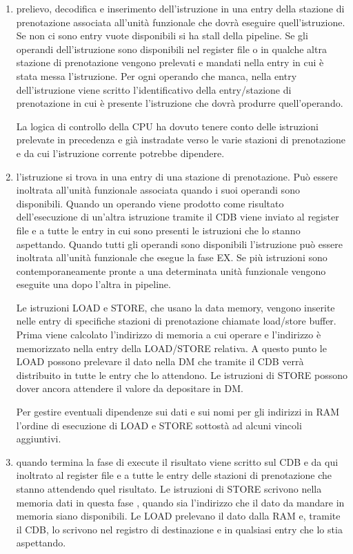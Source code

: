 \begin{enumerate}
  \item {} prelievo, decodifica e inserimento dell'istruzione in una entry della stazione di prenotazione associata all'unità funzionale che dovrà eseguire quell'istruzione. Se non ci sono entry vuote disponibili si ha stall della pipeline. Se gli operandi dell'istruzione sono disponibili nel register file o in qualche altra stazione di prenotazione vengono prelevati e mandati nella entry in cui è stata messa l'istruzione. 
    Per ogni operando che manca, nella entry dell'istruzione viene scritto l'identificativo della entry/stazione di prenotazione in cui è presente l'istruzione che dovrà produrre quell'operando. 

    La logica di controllo della CPU ha dovuto tenere conto delle istruzioni prelevate in precedenza e già instradate verso le varie stazioni di prenotazione e da cui l'istruzione corrente potrebbe dipendere.
  \item {}  l'istruzione si trova in una entry di una stazione di prenotazione. Può essere inoltrata all'unità funzionale associata quando i suoi operandi sono disponibili. Quando un operando viene prodotto come risultato dell'esecuzione di un'altra istruzione tramite il CDB viene inviato al register file e a tutte le entry in cui sono presenti le istruzioni che lo stanno aspettando. Quando tutti gli operandi sono disponibili l'istruzione può essere inoltrata all'unità funzionale che esegue la fase EX. Se più istruzioni sono contemporaneamente pronte a una determinata unità funzionale vengono eseguite una dopo l'altra in pipeline. 

  Le istruzioni LOAD e STORE, che usano la data memory, vengono inserite nelle entry di specifiche stazioni di prenotazione chiamate load/store buffer. Prima viene calcolato l'indirizzo di memoria a cui operare e l'indirizzo è memorizzato nella entry della LOAD/STORE relativa. A questo punto le LOAD possono prelevare il dato nella DM che tramite il CDB verrà distribuito in tutte le entry che lo attendono. Le istruzioni di STORE possono dover ancora attendere il valore da depositare in DM. 
  
  Per gestire eventuali dipendenze sui dati e sui nomi per gli indirizzi in RAM l'ordine di esecuzione di LOAD e STORE sottostà ad alcuni vincoli aggiuntivi. 
  \item {} quando termina la fase di execute il risultato viene scritto sul CDB e da qui inoltrato al register file e a tutte le entry delle stazioni di prenotazione che stanno attendendo quel risultato. Le istruzioni di STORE scrivono nella memoria dati in questa fase , quando sia l'indirizzo che il dato da mandare in memoria siano disponibili. Le LOAD prelevano il dato dalla RAM e, tramite il CDB, lo scrivono nel registro di destinazione e in qualsiasi entry che lo stia aspettando. 
\end{enumerate}

